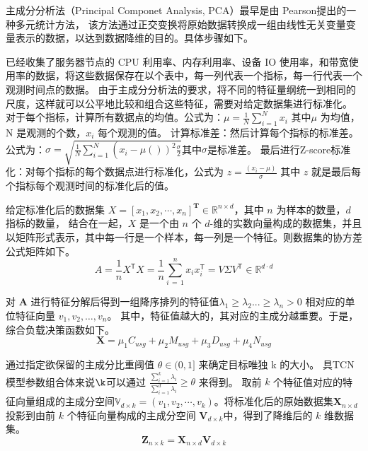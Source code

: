 主成分分析法（Principal Componet Analysis, PCA）最早是由 Pearson\cite{kpfrs1901lines}提出的一种多元统计方法，
该方法通过正交变换将原始数据转换成一组由线性无关变量变量表示的数据，以达到数据降维的目的\cite{李可佳2023基于主成分分析和函数机制的差分隐私线性回归算法}。具体步骤如下。

已经收集了服务器节点的 CPU 利用率、内存利用率、设备 IO 使用率，和带宽使用率的数据，将这些数据保存在以个表中，每一列代表一个指标，每一行代表一个观测时间点的数据。
由于主成分分析法的要求，将不同的特征量纲统一到相同的尺度，这样就可以公平地比较和组合这些特征，需要对给定数据集进行标准化。
对于每个指标，计算所有数据点的均值。公式为：$\mu=\frac{1}{N}\sum_{i=1}^{N}x_{i}$ 其中$\mu$ 为均值，N 是观测的个数，$x_{i}$ 每个观测的值。
计算标准差：然后计算每个指标的标准差。公式为：$\sigma = \sqrt{\frac{1}{N} \sum_{i = 1}^{N} \left(\right. x_{i} - \mu \left(\left.\right)\right)^{2}\frac{\sigma}{2}}$其中$\sigma$是标准差。
最后进行Z-score标准化：对每个指标的每个数据点进行标准化，公式为 $z = \frac{(x_{i} - \mu)}{\sigma}$ 其中 $z$ 就是最后每个指标每个观测时间的标准化后的值。

给定标准化后的数据集 $X = [x_1, x_2, \cdots, x_n]^{\mathbf{T}} \in \mathbb{R}^{n \times d}$，其中 $n$ 为样本的数量，$d$ 指标的数量，
结合在一起，\( X \) 是一个由 \( n \) 个 \( d \)-维的实数向量构成的数据集，并且以矩阵形式表示，其中每一行是一个样本，每一列是一个特征。则数据集的协方差公式矩阵如下。
\begin{equation}
  A={\frac{1}{n}}X^{\mathsf{T}}X={\frac{1}{n}}\sum_{i\,=\,1}^{n}x_{i}x_{i}^{\mathsf{T}}=V\Sigma V^{\mathsf{T}}\in\mathbb{R}^{d\cdot d}
\end{equation}

对 $\mathbf{A}$ 进行特征分解后得到一组降序排列的特征值$\lambda_1 \ge \lambda_2 ... \ge \lambda_n > 0$ 相对应的单位特征向量 $v_1, v_2, \dots, v_n$。
其中，特征值越大的，其对应的主成分越重要。于是，综合负载决策函数如下。
\begin{equation}
  \mathbf{X} = \mu_1C_{usg} + \mu_2M_{usg} + \mu_3D_{usg} + \mu_4N_{usg}
\end{equation}

通过指定欲保留的主成分比重阈值 $\theta \in (0, 1]$ 来确定目标唯独 k 的大小。
具TCN 模型参数组合体来说$\k$可以通过 $\frac{\sum^{k}_{i = 1}\lambda_i}{\sum^{d}_{i = 1}\lambda_i} \ge \theta$ 来得到。
取前 $k$ 个特征值对应的特征向量组成的主成分空间$\mathbb{V}_{d \times k} = (v_1, v_2, \cdots, v_k)$。将标准化后的原始数据集$\mathbf{X}_{n \times d}$ 投影到由前 $k$ 个特征向量构成的主成分空间 $\mathbf{V}_{d \times k}$中，得到了降维后的 $k$ 维数据集。
\begin{equation}
  \mathbf{Z}_{n \times k} = \mathbf{X}_{n \times d}\mathbf{V}_{d \times k}
\end{equation}

